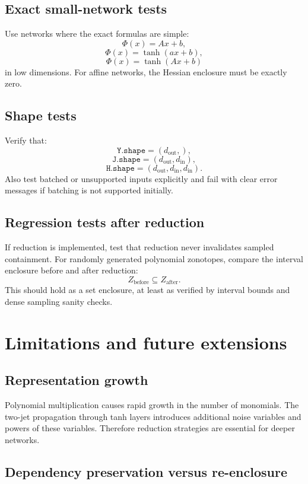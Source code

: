\documentclass[11pt]{article}
\begin{document}
\subsection{Exact small-network tests}

Use networks where the exact formulas are simple:
\[
    \Phi(x)=Ax+b,
\]
\[
    \Phi(x)=\tanh(ax+b),
\]
\[
    \Phi(x)=\tanh(Ax+b)
\]
in low dimensions. For affine networks, the Hessian enclosure must be exactly zero.

\subsection{Shape tests}

Verify that:
\[
    \texttt{Y.shape}=(d_{\mathrm{out}},),
\]
\[
    \texttt{J.shape}=(d_{\mathrm{out}},d_{\mathrm{in}}),
\]
\[
    \texttt{H.shape}=(d_{\mathrm{out}},d_{\mathrm{in}},d_{\mathrm{in}}).
\]
Also test batched or unsupported inputs explicitly and fail with clear error messages if batching is not supported initially.

\subsection{Regression tests after reduction}

If reduction is implemented, test that reduction never invalidates sampled containment. For randomly generated polynomial zonotopes, compare the interval enclosure before and after reduction:
\[
    Z_{\mathrm{before}}\subseteq Z_{\mathrm{after}}.
\]
This should hold as a set enclosure, at least as verified by interval bounds and dense sampling sanity checks.

\section{Limitations and future extensions}

\subsection{Representation growth}

Polynomial multiplication causes rapid growth in the number of monomials. The two-jet propagation through tanh layers introduces additional noise variables and powers of these variables. Therefore reduction strategies are essential for deeper networks.

\subsection{Dependency preservation versus re-enclosure}
\end{document}
